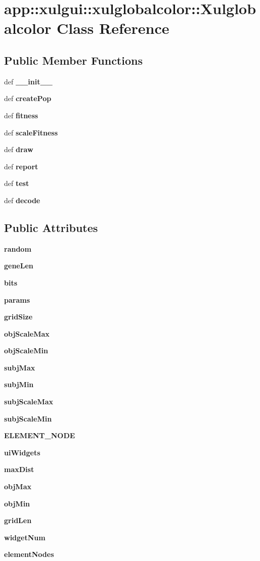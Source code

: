 \section{app::xulgui::xulglobalcolor::Xulglobalcolor Class Reference}
\label{classapp_1_1xulgui_1_1xulglobalcolor_1_1Xulglobalcolor}
\subsection*{Public Member Functions}
\begin{CompactItemize}
\item 
def {\bf \_\-\_\-init\_\-\_\-}
\item 
def {\bf createPop}
\item 
def {\bf fitness}
\item 
def {\bf scaleFitness}
\item 
def {\bf draw}
\item 
def {\bf report}
\item 
def {\bf test}
\item 
def {\bf decode}
\end{CompactItemize}
\subsection*{Public Attributes}
\begin{CompactItemize}
\item 
{\bf random}
\item 
{\bf geneLen}
\item 
{\bf bits}
\item 
{\bf params}
\item 
{\bf gridSize}
\item 
{\bf objScaleMax}
\item 
{\bf objScaleMin}
\item 
{\bf subjMax}
\item 
{\bf subjMin}
\item 
{\bf subjScaleMax}
\item 
{\bf subjScaleMin}
\item 
{\bf ELEMENT\_\-NODE}
\item 
{\bf uiWidgets}
\item 
{\bf maxDist}
\item 
{\bf objMax}
\item 
{\bf objMin}
\item 
{\bf gridLen}
\item 
{\bf widgetNum}
\item 
{\bf elementNodes}
\end{CompactItemize}


